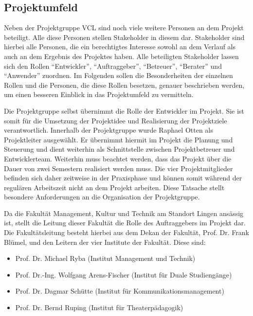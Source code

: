 \subsection{Projektumfeld}
\label{sec:Projektumfeld}

Neben der Projektgruppe \acs{VCL} sind noch viele weitere Personen an dem
Projekt beteiligt. Alle diese Personen stellen Stakeholder in diesem dar.
Stakeholder sind hierbei alle Personen, die ein berechtigtes Interesse sowohl
an dem Verlauf als auch an dem Ergebnis des Projektes haben. Alle
beteiligten Stakeholder lassen sich den Rollen "`Entwickler"', "`Auftraggeber"',
"`Betreuer"', "`Berater"' und "`Anwender"' zuordnen. Im Folgenden sollen die
Besonderheiten der einzelnen Rollen und die Personen, die diese Rollen besetzen,
genauer beschrieben werden, um einen besseren Einblick in das Projektumfeld zu
vermitteln.

Die Projektgruppe selbst übernimmt die Rolle der Entwickler im Projekt. Sie ist
somit für die Umsetzung der Projektidee und Realisierung der Projektziele
verantwortlich. Innerhalb der Projektgruppe wurde Raphael Otten als
Projektleiter ausgewählt. Er übernimmt hiermit im Projekt die Planung und
Steuerung und dient weiterhin als Schnittstelle zwischen Projektbetreuer und
Entwicklerteam. Weiterhin muss beachtet werden, dass das Projekt über die Dauer
von zwei Semestern realisiert werden muss. Die vier Projektmitglieder befinden
sich daher zeitweise in der Praxisphase und können somit während der regulären
Arbeitszeit nicht an dem Projekt arbeiten. Diese Tatsache stellt besondere
Anforderungen an die Organisation der Projektgruppe.

Da die Fakultät Management, Kultur und Technik am Standort Lingen ansässig ist,
stellt die Leitung dieser Fakultät die Rolle des Auftraggebers im Projekt dar.
Die Fakultätsleitung besteht hierbei aus dem Dekan der Fakultät, Prof. Dr. Frank
Blümel, und den Leitern der vier Institute der Fakultät. Diese sind:

\begin{itemize}
  \item Prof. Dr. Michael Ryba (Institut Management und Technik)
  \item Prof. Dr.-Ing. Wolfgang Arens-Fischer (Institut für Duale Studiengänge)
  \item Prof. Dr. Dagmar Schütte (Institut für Kommunikationsmanagement)
  \item Prof. Dr. Bernd Ruping (Institut für Theaterpädagogik)
\end{itemize}

